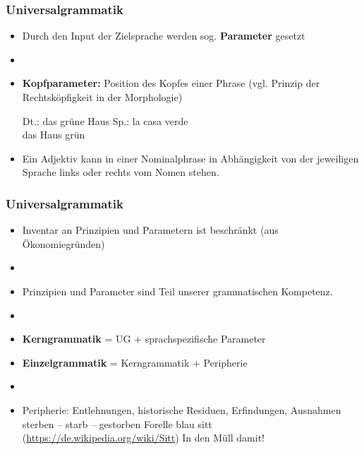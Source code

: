 \begin{frame}
\frametitle{Universalgrammatik}

\begin{itemize}

	\begin{block}{Parameter}
	Einzelsprachlich spezifische Regeln, die Möglichkeiten darstellen, die universalgrammatischen Prinzipien auszubuchstabieren.
	\end{block}
	
	\item Durch den Input der Zielsprache werden sog. \textbf{Parameter} gesetzt
	\item[]
	\item \textbf{Kopfparameter:} Position des Kopfes einer Phrase (vgl. Prinzip der Rechtsköpfigkeit in der Morphologie)
	
	\eal
	\ex Dt.: das grüne \alert{Haus}
	\ex
	\gll Sp.: la \alert{casa} verde\\
		{} das Haus grün\\
	\zl
	
	\item Ein Adjektiv kann in einer Nominalphrase in Abhängigkeit von der jeweiligen Sprache links oder rechts vom Nomen stehen.


\end{itemize}

\end{frame}


\begin{frame}
\frametitle{Universalgrammatik}

\begin{itemize}
	\item Inventar an Prinzipien und Parametern ist beschränkt (aus Ökonomiegründen)
	\item[]
	\item Prinzipien und Parameter sind Teil unserer grammatischen Kompetenz.
	\item[]
	\item \textbf{Kerngrammatik} = UG + sprachspezifische Parameter
	\item \textbf{Einzelgrammatik} = Kerngrammatik + Peripherie
	\item[]
	\item Peripherie: Entlehnungen, historische Residuen, Erfindungen, Ausnahmen \citep[vgl.][]{Nolda&Co14a}
	\eal
	\ex sterben -- starb -- gestorben
	\ex Forelle blau
	\ex sitt (\url{https://de.wikipedia.org/wiki/Sitt})
	\ex In den Müll damit!
	\zl
	
\end{itemize}

\end{frame}



